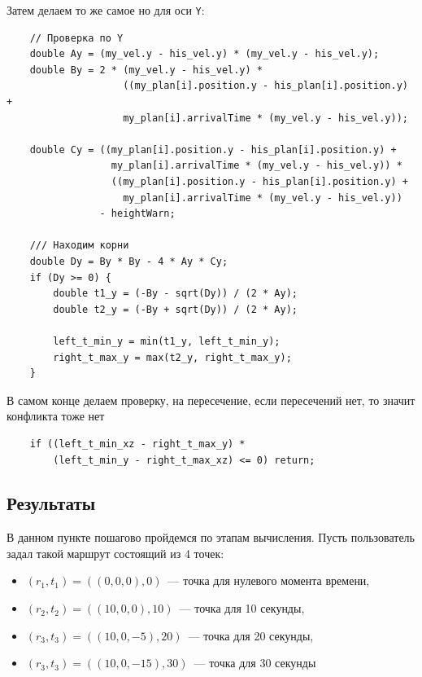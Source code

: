 \documentclass[a4paper,12pt]{article}
\begin{document}
Затем делаем то же самое но для оси \texttt{Y}:
\begin{verbatim}
    // Проверка по Y
    double Ay = (my_vel.y - his_vel.y) * (my_vel.y - his_vel.y);
    double By = 2 * (my_vel.y - his_vel.y) * 
                    ((my_plan[i].position.y - his_plan[i].position.y) +
                    my_plan[i].arrivalTime * (my_vel.y - his_vel.y));
    
    double Cy = ((my_plan[i].position.y - his_plan[i].position.y) +
                  my_plan[i].arrivalTime * (my_vel.y - his_vel.y)) *
                  ((my_plan[i].position.y - his_plan[i].position.y) + 
                    my_plan[i].arrivalTime * (my_vel.y - his_vel.y))
                - heightWarn;
    
    /// Находим корни
    double Dy = By * By - 4 * Ay * Cy;
    if (Dy >= 0) {
        double t1_y = (-By - sqrt(Dy)) / (2 * Ay);
        double t2_y = (-By + sqrt(Dy)) / (2 * Ay);
    
        left_t_min_y = min(t1_y, left_t_min_y);
        right_t_max_y = max(t2_y, right_t_max_y);
    }
\end{verbatim}
В самом конце делаем проверку, на пересечение, если пересечений нет, то значит конфликта тоже нет
\begin{verbatim}
    if ((left_t_min_xz - right_t_max_y) * 
        (left_t_min_y - right_t_max_xz) <= 0) return;
\end{verbatim}

\subsection{Результаты}

В данном пункте пошагово пройдемся по этапам вычисления. Пусть пользователь задал такой маршрут состоящий из 4 точек: 
\begin{itemize}
    \item $(r_1,t_1) = ((0,0,0),0)$~--- точка для нулевого момента времени,
    \item $(r_2,t_2) = ((10,0,0),10)$~--- точка для 10 секунды,
    \item $(r_3,t_3) = ((10,0,-5),20)$~--- точка для 20 секунды,
    \item $(r_3,t_3) = ((10,0,-15),30)$~--- точка для 30 секунды
\end{itemize}
\end{document}
